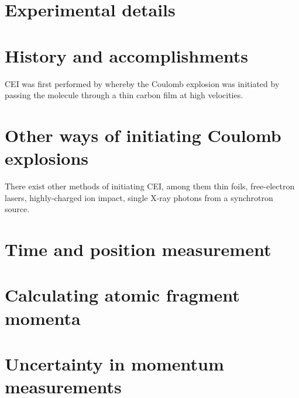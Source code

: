\section{Experimental details}

\section{History and accomplishments}
CEI was first performed by \citet{Vager89} whereby the Coulomb explosion was initiated by passing the molecule through a thin carbon film at high velocities.

\section{Other ways of initiating Coulomb explosions}
There exist other methods of initiating CEI, among them thin foils, free-electron lasers, highly-charged ion impact, single X-ray photons from a synchrotron source.

\section{Time and position measurement}

\section{Calculating atomic fragment momenta}

\section{Uncertainty in momentum measurements}